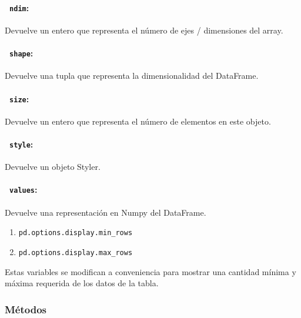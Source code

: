 \paragraph{~\hspace{2em}\texttt{ndim}:} Devuelve un entero que representa el
número de ejes / dimensiones del array.

\paragraph{~\hspace{2em}\texttt{shape}:} Devuelve una tupla que representa la
dimensionalidad del DataFrame.

\paragraph{~\hspace{2em}\texttt{size}:} Devuelve un entero que representa el
número de elementos en este objeto.

\paragraph{~\hspace{2em}\texttt{style}:} Devuelve un objeto Styler.

\paragraph{~\hspace{2em}\texttt{values}:} Devuelve una representación en Numpy
del DataFrame.

\begin{enumerate}
    \item\texttt{pd.options.display.min\_rows}
    \item\texttt{pd.options.display.max\_rows}
\end{enumerate}
Estas variables se modifican a conveniencia para mostrar una cantidad mínima y
máxima requerida de los datos de la tabla.

\subsubsection{Métodos}

